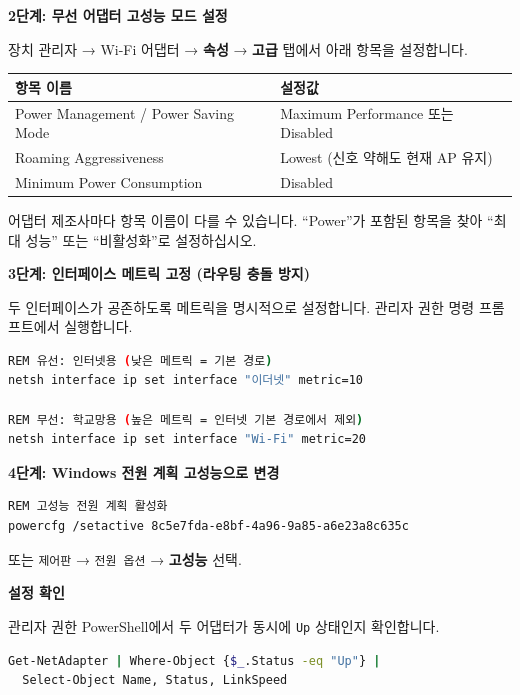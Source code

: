\documentclass[a4paper,12pt]{article}
\newcommand{\menu}[1]{\textcolor{primary}{\textbf{#1}}}
\begin{document}
\textbf{2단계: 무선 어댑터 고성능 모드 설정}

장치 관리자 → Wi-Fi 어댑터 → \menu{속성} → \textbf{고급} 탭에서 아래 항목을 설정합니다.

\begin{center}
\begin{tabular}{ll}
\toprule
\textbf{항목 이름} & \textbf{설정값} \\
\midrule
Power Management / Power Saving Mode & Maximum Performance 또는 Disabled \\
Roaming Aggressiveness & Lowest (신호 약해도 현재 AP 유지) \\
Minimum Power Consumption & Disabled \\
\bottomrule
\end{tabular}
\end{center}

\begin{notebox}
  어댑터 제조사마다 항목 이름이 다를 수 있습니다.
  ``Power''가 포함된 항목을 찾아 ``최대 성능'' 또는 ``비활성화''로 설정하십시오.
\end{notebox}

\textbf{3단계: 인터페이스 메트릭 고정 (라우팅 충돌 방지)}

두 인터페이스가 공존하도록 메트릭을 명시적으로 설정합니다.
관리자 권한 명령 프롬프트에서 실행합니다.

\begin{lstlisting}[language=bash]
REM 유선: 인터넷용 (낮은 메트릭 = 기본 경로)
netsh interface ip set interface "이더넷" metric=10

REM 무선: 학교망용 (높은 메트릭 = 인터넷 기본 경로에서 제외)
netsh interface ip set interface "Wi-Fi" metric=20
\end{lstlisting}

\textbf{4단계: Windows 전원 계획 고성능으로 변경}

\begin{lstlisting}[language=bash]
REM 고성능 전원 계획 활성화
powercfg /setactive 8c5e7fda-e8bf-4a96-9a85-a6e23a8c635c
\end{lstlisting}

또는 \texttt{제어판} → \texttt{전원 옵션} → \menu{고성능} 선택.

\textbf{설정 확인}

관리자 권한 PowerShell에서 두 어댑터가 동시에 \texttt{Up} 상태인지 확인합니다.

\begin{lstlisting}[language=bash]
Get-NetAdapter | Where-Object {$_.Status -eq "Up"} |
  Select-Object Name, Status, LinkSpeed
\end{lstlisting}
\end{document}
